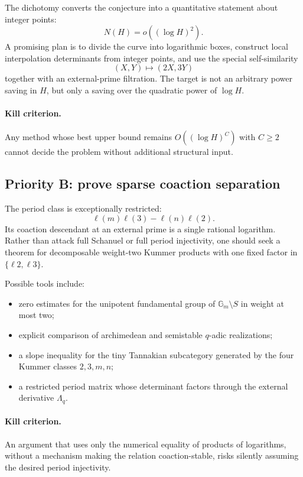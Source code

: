 \documentclass[11pt,oneside]{article}
\theoremstyle{definition}
\begin{document}
The dichotomy converts the conjecture into a quantitative statement about integer points:
\[
  N(H)=o((\log H)^2).
\]
A promising plan is to divide the curve into logarithmic boxes, construct local interpolation determinants from integer points, and use the special self-similarity
\[
  (X,Y)\mapsto(2X,3Y)
\]
together with an external-prime filtration.  The target is not an arbitrary power saving in $H$, but only a saving over the quadratic power of $\log H$.

\paragraph{Kill criterion.}
Any method whose best upper bound remains $O((\log H)^C)$ with $C\ge2$ cannot decide the problem without additional structural input.

\subsection{Priority B: prove sparse coaction separation}

The period class is exceptionally restricted:
\[
  \ell(m)\ell(3)-\ell(n)\ell(2).
\]
Its coaction descendant at an external prime is a single rational logarithm.  Rather than attack full Schanuel or full period injectivity, one should seek a theorem for decomposable weight-two Kummer products with one fixed factor in $\{\ell2,\ell3\}$.

Possible tools include:
\begin{itemize}
\item zero estimates for the unipotent fundamental group of $\mathbb G_m\setminus S$ in weight at most two;
\item explicit comparison of archimedean and semistable $q$-adic realizations;
\item a slope inequality for the tiny Tannakian subcategory generated by the four Kummer classes $2,3,m,n$;
\item a restricted period matrix whose determinant factors through the external derivative $\Lambda_q$.
\end{itemize}

\paragraph{Kill criterion.}
An argument that uses only the numerical equality of products of logarithms, without a mechanism making the relation coaction-stable, risks silently assuming the desired period injectivity.
\end{document}
